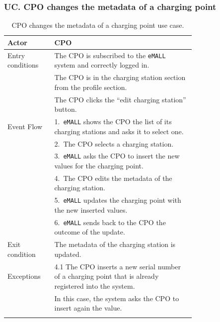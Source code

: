 \subsubsection*{UC\cuc . CPO changes the metadata of a charging point}
\begin{center}
    \begin{longtable}{lp{0.75\linewidth}}
        \hline
        Actor            & CPO                                                                                                     \\
        \hline
        Entry conditions & The CPO is subscribed to the \verb|eMALL| system and correctly logged in.                               \\
        & The CPO is in the charging station section from the profile section.                                    \\
        & The CPO clicks the “edit charging station” button.                                                      \\
        \hline
        Event Flow       & 1.\ \verb|eMALL| shows the CPO the list of its charging stations and asks it to select one.             \\
        & 2.\ The CPO selects a charging station.                                                                 \\
        & 3.\ \verb|eMALL| asks the CPO to insert the new values for the charging point.                          \\
        & 4.\ The CPO edits the metadata of the charging station.                                                 \\
        & 5.\ \verb|eMALL| updates the charging point with the new inserted values.                               \\
        & 6.\ \verb|eMALL| sends back to the CPO the outcome of the update.                                       \\
        \hline
        Exit condition   & The metadata of the charging station is updated.                                                        \\
        \hline
        Exceptions       & 4.1 The CPO inserts a new serial number of a charging point that is already registered into the system. \\
        & In this case, the system asks the CPO to insert again the value.                                        \\
        \hline
        \caption{CPO changes the metadata of a charging point use case.}
        \label{tab: CPO_updates_charging_point_use_case}
    \end{longtable}


\end{center}
